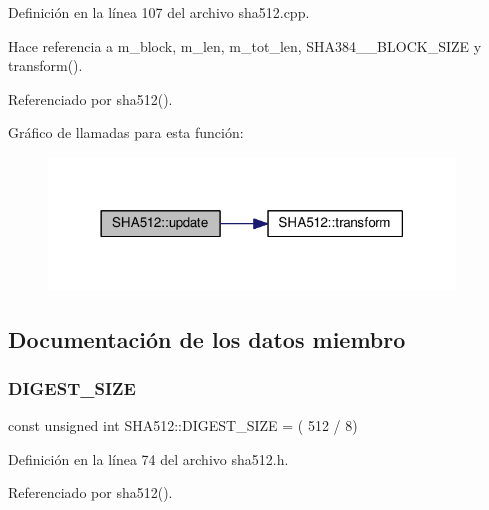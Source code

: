 Definición en la línea 107 del archivo sha512.\+cpp.



Hace referencia a m\+\_\+block, m\+\_\+len, m\+\_\+tot\+\_\+len, S\+H\+A384\+\_\+\_\+\+B\+L\+O\+C\+K\+\_\+\+S\+I\+ZE y transform().



Referenciado por sha512().

Gráfico de llamadas para esta función\+:\nopagebreak
\begin{figure}[H]
\begin{center}
\leavevmode
\includegraphics[width=306pt]{classSHA512_aa1c4c23e601cbc51deda2fecbfed71d6_cgraph}
\end{center}
\end{figure}


\subsection{Documentación de los datos miembro}
\hypertarget{classSHA512_a911d66aedbff405df349ef300791d8eb}{}\label{classSHA512_a911d66aedbff405df349ef300791d8eb} 
\subsubsection{\texorpdfstring{D\+I\+G\+E\+S\+T\+\_\+\+S\+I\+ZE}{DIGEST\_SIZE}}
{\footnotesize\ttfamily const unsigned int S\+H\+A512\+::\+D\+I\+G\+E\+S\+T\+\_\+\+S\+I\+ZE = ( 512 / 8)\hspace{0.3cm}{\ttfamily [static]}}



Definición en la línea 74 del archivo sha512.\+h.



Referenciado por sha512().

\hypertarget{classSHA512_aef099f8df4da2e3ea0a56bf5f0479fce}{}\label{classSHA512_aef099f8df4da2e3ea0a56bf5f0479fce} 

